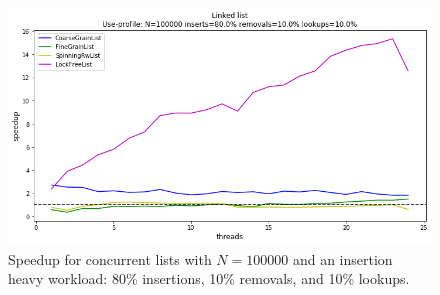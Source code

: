\documentclass[11pt]{article}
\begin{document}
\begin{figure}[h]
\centering
\includegraphics[width=1.0\linewidth]{figs/lateday/combined/lateday_combined_list_insert_80_lookup_10_removal_10}

\caption{
Speedup for concurrent lists with $N=100000$ and an insertion heavy workload:
80\% insertions, 10\% removals, and 10\% lookups.}
\label{fig:listInsertHeavy}
\end{figure}
\end{document}
